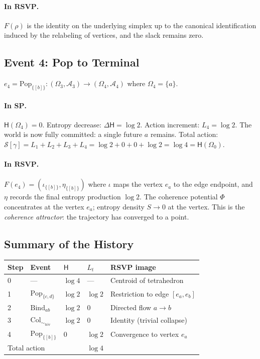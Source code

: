 \documentclass[12pt,a4paper]{article}
\theoremstyle{definition}
\theoremstyle{remark}
\newcommand{\Ent}{\ensuremath{\mathsf{H}}}
\newcommand{\SP}{\mathbf{SP}}
\newcommand{\RSVP}{\mathbf{RSVP}}
\newcommand{\Pop}{\ensuremath{\mathrm{Pop}}}
\newcommand{\Bind}{\ensuremath{\mathrm{Bind}}}
\newcommand{\Col}{\ensuremath{\mathrm{Col}}}
\newcommand{\PhiF}{\Phi}
\newcommand{\SF}{S}
\begin{document}
\paragraph{In $\RSVP$.}
$F(\rho)$ is the identity on the underlying simplex up to the canonical identification induced by the relabeling of vertices, and the slack remains zero.

\subsection{Event 4: Pop to Terminal}

$e_4=\Pop_{\{[b]\}}:(\Omega_3,\mathcal{A}_3)\to(\Omega_4,\mathcal{A}_4)$
where $\Omega_4=\{a\}$.

\paragraph{In $\SP$.}
$\Ent(\Omega_4)=0$. Entropy decrease: $\Delta\Ent=\log 2$. Action increment: $L_4=\log 2$.
The world is now fully committed: a single future $a$ remains. Total action: $\mathcal{S}[\gamma]
=L_1+L_2+L_3+L_4=\log 2+0+0+\log 2=\log 4=\Ent(\Omega_0)$.

\paragraph{In $\RSVP$.}
$F(e_4)=(\iota_{\{[b]\}},\eta_{\{[b]\}})$ where $\iota$ maps the vertex $e_a$ to
the edge endpoint, and $\eta$ records the final entropy production $\log 2$. The
coherence potential $\PhiF$ concentrates at the vertex $e_a$; entropy density
$\SF\to 0$ at the vertex. This is the \emph{coherence attractor}: the trajectory has
converged to a point.

\subsection{Summary of the History}

\begin{center}
\renewcommand{\arraystretch}{1.5}
\begin{tabular}{lllll}
\toprule
\textbf{Step} & \textbf{Event} & $\Ent$ & $L_t$ & \textbf{RSVP image} \\
\midrule
0 & --- & $\log 4$ & --- & Centroid of tetrahedron \\
1 & $\Pop_{\{c,d\}}$ & $\log 2$ & $\log 2$ & Restriction to edge $[e_a,e_b]$ \\
2 & $\Bind_{ab}$ & $\log 2$ & $0$ & Directed flow $a\to b$ \\
3 & $\Col_{\sim_{\mathrm{triv}}}$ & $\log 2$ & $0$ & Identity (trivial collapse) \\
4 & $\Pop_{\{[b]\}}$ & $0$ & $\log 2$ & Convergence to vertex $e_a$ \\
\midrule
\multicolumn{3}{l}{Total action} & $\log 4$ & \\
\bottomrule
\end{tabular}
\end{center}
\end{document}
